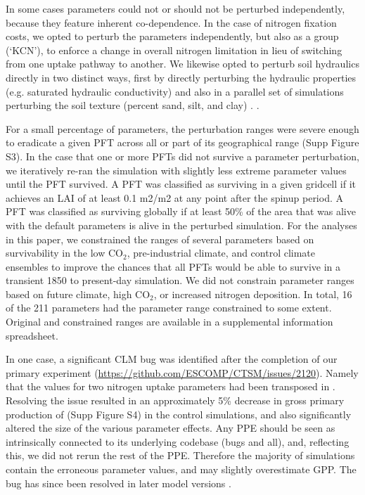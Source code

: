 \documentclass[draft]{agujournal2019}
\begin{document}
In some cases parameters could not or should not be perturbed independently, because they feature inherent co-dependence. In the case of nitrogen fixation costs, we opted to perturb the parameters independently, but also as a group (`KCN'), to enforce a change in overall nitrogen limitation in lieu of switching from one uptake pathway to another.  We likewise opted to perturb soil hydraulics directly in two distinct ways, first by directly perturbing the hydraulic properties (e.g. saturated hydraulic conductivity) and also  in a parallel set of simulations perturbing the soil texture (percent sand, silt, and clay) .
 \cite{migliavacca2021}.

For a small percentage of parameters, the perturbation ranges were severe enough to eradicate a given PFT across all or part of its geographical range (Supp Figure S3). In the case that one or more PFTs did not survive a parameter perturbation, we iteratively re-ran the simulation with slightly less extreme parameter values until the PFT survived. A PFT was classified as surviving in a given gridcell if it achieves an LAI of at least 0.1 m2/m2 at any point after the spinup period. A PFT was classified as surviving globally if at least 50\% of the area that
was alive with the default parameters is alive in the perturbed simulation. For the analyses in this paper, we constrained the ranges of several parameters based on survivability in the low CO$_2$, pre-industrial climate, and control climate ensembles to improve the chances that all PFTs would be able to survive in a transient 1850 to present-day simulation. We did not constrain parameter ranges based on future climate, high CO$_2
$, or increased nitrogen deposition. In total, 16 of the 211 parameters had the parameter range constrained to some extent. Original and constrained ranges are available in a supplemental information spreadsheet.

In one case, a significant CLM bug was identified after the completion of our primary experiment (\url{https://github.com/ESCOMP/CTSM/issues/2120}). Namely that the values for two nitrogen uptake parameters had been transposed in . Resolving the issue resulted in an approximately 5\% decrease in gross primary production of (Supp Figure S4) in the control simulations, and also significantly altered the size of the various parameter effects. Any PPE should be seen as intrinsically connected to its underlying codebase (bugs and all), and, reflecting this, we did not rerun the rest of the PPE. Therefore the majority of simulations contain the erroneous parameter values, and may slightly overestimate GPP.  The bug has since been resolved in later model versions .
\end{document}

